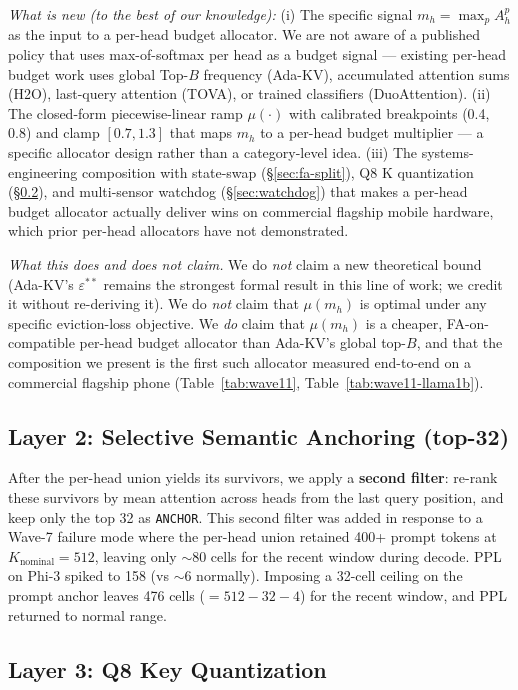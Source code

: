 \documentclass[sigconf, anonymous=false, screen=true]{acmart}
\begin{document}
\noindent\emph{What is new (to the best of our knowledge):} (i) The specific signal $m_h = \max_p A_h^p$ as the input to a per-head budget allocator. We are not aware of a published policy that uses max-of-softmax per head as a budget signal --- existing per-head budget work uses global Top-$B$ frequency (Ada-KV), accumulated attention sums (H2O), last-query attention (TOVA), or trained classifiers (DuoAttention). (ii) The closed-form piecewise-linear ramp $\mu(\cdot)$ with calibrated breakpoints (0.4, 0.8) and clamp $[0.7, 1.3]$ that maps $m_h$ to a per-head budget multiplier --- a specific allocator design rather than a category-level idea. (iii) The systems-engineering composition with state-swap (\S\ref{sec:fa-split}), Q8 K quantization (\S\ref{sec:layer3}), and multi-sensor watchdog (\S\ref{sec:watchdog}) that makes a per-head budget allocator actually deliver wins on commercial flagship mobile hardware, which prior per-head allocators have not demonstrated.

\noindent\emph{What this does and does not claim.} We do \emph{not} claim a new theoretical bound (Ada-KV's $\varepsilon^{\ast\ast}$ remains the strongest formal result in this line of work; we credit it without re-deriving it). We do \emph{not} claim that $\mu(m_h)$ is optimal under any specific eviction-loss objective. We \emph{do} claim that $\mu(m_h)$ is a cheaper, FA-on-compatible per-head budget allocator than Ada-KV's global top-$B$, and that the composition we present is the first such allocator measured end-to-end on a commercial flagship phone (Table~\ref{tab:wave11}, Table~\ref{tab:wave11-llama1b}).

\subsection{Layer 2: Selective Semantic Anchoring (top-32)}

After the per-head union yields its survivors, we apply a \textbf{second filter}: re-rank these survivors by mean attention across heads from the last query position, and keep only the top 32 as \texttt{ANCHOR}. This second filter was added in response to a Wave-7 failure mode where the per-head union retained 400+ prompt tokens at $K_{\text{nominal}}{=}512$, leaving only $\sim$80 cells for the recent window during decode. PPL on Phi-3 spiked to 158 (vs $\sim$6 normally). Imposing a 32-cell ceiling on the prompt anchor leaves 476 cells ($=512-32-4$) for the recent window, and PPL returned to normal range.

\subsection{Layer 3: Q8 Key Quantization}
\label{sec:layer3}
\end{document}
